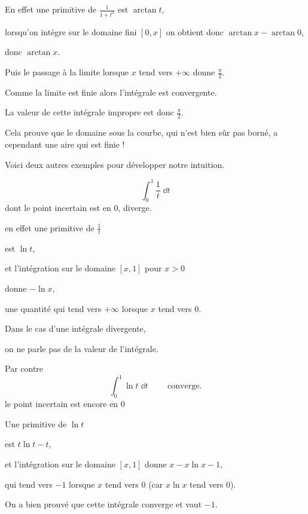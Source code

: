 En effet une primitive de $\frac{1}{1+t^2}$ est $\arctan t$, 

\change
lorsqu'on intègre sur le domaine fini $[0,x]$ 
on obtient donc $\arctan x-\arctan 0$, 

\change
donc $\arctan x$.

\change
Puis le passage à la limite lorsque $x$ tend vers $+\infty$ 
donne $\frac{\pi}{2}$.

Comme la limite est finie alors l'intégrale est convergente.

\change
La valeur de cette intégrale impropre est donc $\frac{\pi}{2}$.

\change
Cela prouve que le domaine sous la courbe, qui n'est bien sûr pas borné,
a cependant une aire qui est finie !


\diapo

Voici deux autres exemples pour développer notre intuition.

\change

$$
\int_0^1 \frac{1}{t}\;\dd t
$$
dont le point incertain est en $0$, diverge.
\change




en effet une primitive de $\frac{1}{t}$ 

\change
est $\ln t$, 


et l'intégration sur le domaine $[x,1]$ pour $x>0$ 

\change 
donne  $-\ln x$, 

\change
une quantité qui tend vers $+\infty$ lorsque $x$ tend vers $0$. 

Dans le cas d'une intégrale divergente, 

on ne parle pas de la valeur de l'intégrale.


\change

Par contre 
$$
\int_0^1 \ln t\;\dd t\qquad \text{ converge.}
$$ 
le point incertain est encore en $0$
\change

Une primitive de $\ln t$ 

\change
est $t\ln t -t$, 

\change
et l'intégration sur le domaine $[x,1]$ donne $x-x\ln x-1$, 

\change
qui tend vers $-1$ lorsque $x$ tend vers $0$ 
(car $x\ln x$ tend vers $0$). 

On a bien prouvé que cette intégrale converge et vaut $-1$.



\diapo

